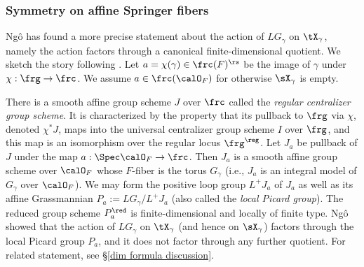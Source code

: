 \subsubsection{Symmetry on affine Springer fibers}\label{sss:sym ASF} Ng\^o has found a more precise statement about the action of $LG_{\gamma}$ on $\tX_{\gamma}$, namely the action factors through a canonical finite-dimensional quotient. We sketch the story following \cite[\S3.3]{NgoFL}. Let $a=\chi(\gamma)\in\frc(F)^{\rs}$ be the image of $\gamma$ under $\chi:\frg\to \frc$. We assume $a\in\frc(\calO_{F})$ for otherwise $\sX_{\gamma}$ is empty. 

There is a smooth affine group scheme $J$ over $\frc$ called the {\em regular centralizer group scheme}. It is characterized by the property that its pullback to $\frg$ via $\chi$, denoted $\chi^{*}J$, maps into the universal centralizer group scheme $I$ over $\frg$, and this map is an isomorphism over the regular locus $\frg^{\reg}$. Let $J_{a}$ be pullback of $J$ under the map $a:\Spec\calO_{F}\to \frc$. Then $J_{a}$ is a smooth affine group scheme over $\calO_{F}$ whose $F$-fiber is the torus $G_{\gamma}$ (i.e., $J_{a}$ is an integral model of $G_{\gamma}$ over $\calO_{F}$). We may form the positive loop group $L^{+}J_{a}$ of $J_{a}$ as well as its affine Grassmannian $P_{a}:=LG_{\gamma}/L^{+}J_{a}$ (also called the {\em local Picard group}). The reduced group scheme $P^{\red}_{a}$ is finite-dimensional and locally of finite type. Ng\^o showed that the action of $LG_{\gamma}$ on $\tX_{\gamma}$ (and hence on $\sX_{\gamma}$) factors through the local Picard group $P_{a}$, and it does not factor through any further quotient. For related statement, see \S\ref{dim formula discussion}.
 


